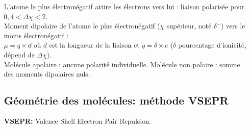 \documentclass{article}
\begin{document}
L'atome le plus électronégatif attire les électrons vers lui : liaison polarisée pour $0,4 < \Delta\chi < 2$.\\
Moment dipolaire de l'atome le plus électronégatif ($\chi$ supérieur, noté $\delta^-$) vers le moins électronégatif :\\
$\mu = q \times d$ où $d$ est la longueur de la liaison et $q = \delta \times e$ ($\delta$ pourcentage d'ionicité, dépend de $\Delta \chi$).\\
Molécule apolaire : aucune polarité individuelle.
Molécule non polaire : somme des moments dipolaires nuls.


\clearpage

\subsection{Géométrie des molécules: méthode VSEPR}

\vspace{5mm}

\textbf{VSEPR:} Valence Shell Electron Pair Repulsion.
\end{document}
